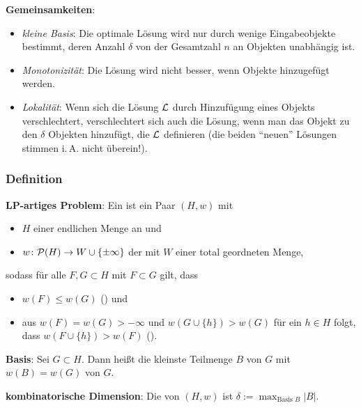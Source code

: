 \textbf{Gemeinsamkeiten}:
\begin{itemize}
    \item
    \emph{kleine Basis}:
    Die optimale Lösung wird nur durch wenige Eingabeobjekte bestimmt,
    deren Anzahl $\delta$ von der Gesamtzahl $n$ an Objekten unabhängig ist.
    
    \item
    \emph{Monotonizität}:
    Die Lösung wird nicht besser, wenn Objekte hinzugefügt werden.
    
    \item
    \emph{Lokalität}:
    Wenn sich die Lösung $\L$ durch Hinzufügung eines Objekts verschlechtert,
    verschlechtert sich auch die Lösung, wenn man das Objekt zu den $\delta$ Objekten
    hinzufügt, die $\L$ definieren
    (die beiden "`neuen"' Lösungen stimmen i.\,A. nicht überein!).
\end{itemize}

\pagebreak

\subsubsection{%
    Definition%
}

\textbf{LP-artiges Problem}:
Ein  ist ein Paar $(H, w)$ mit
\begin{itemize}
    \item
    $H$ einer endlichen Menge an  und
    
    \item
    $w\colon \P(H) \to W \cup \{\pm\infty\}$ der  mit
    $W$ einer total geordneten Menge,
\end{itemize}
sodass für alle $F, G \subset H$ mit $F \subset G$ gilt, dass
\begin{itemize}
    \item
    $w(F) \le w(G)$
    () und
    
    \item
    aus $w(F) = w(G) > -\infty$ und $w(G \cup \{h\}) > w(G)$ für ein $h \in H$ folgt,\\
    dass $w(F \cup \{h\}) > w(F)$
    ().
\end{itemize}

\linie

\textbf{Basis}:
Sei $G \subset H$.
Dann heißt die kleinste Teilmenge $B$ von $G$ mit $w(B) = w(G)$  von $G$.

\textbf{kombinatorische Dimension}:
Die  von $(H, w)$ ist $\delta := \max_{\text{Basis $B$}} |B|$.

